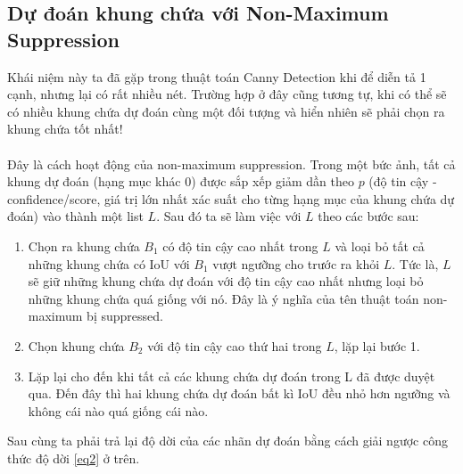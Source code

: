 \documentclass{article}
\begin{document}
\subsection{Dự đoán khung chứa với Non-Maximum Suppression}
Khái niệm này ta đã gặp trong thuật toán Canny Detection khi để diễn tả 1 cạnh, nhưng lại có rất nhiều nét. Trường hợp ở đây cũng tương tự, khi có thể sẽ có nhiều khung chứa dự đoán cùng một đối tượng và hiển nhiên sẽ phải chọn ra khung chứa tốt nhất!\\\\
Đây là cách hoạt động của non-maximum suppression. Trong một bức ảnh, tất cả khung dự đoán (hạng mục khác 0) được sắp xếp giảm dần theo $p$ (độ tin cậy - confidence/score, giá trị lớn nhất xác suất cho từng hạng mục của khung chứa dự đoán) vào thành một list $L$. Sau đó ta sẽ làm việc với $L$ theo các bước sau:
\begin{enumerate}
    \item Chọn ra khung chứa $B_1$ có độ tin cậy cao nhất trong $L$ và loại bỏ tất cả những khung chứa có IoU với $B_1$ vượt ngưỡng cho trước ra khỏi $L$. Tức là, $L$ sẽ giữ những khung chứa dự đoán với độ tin cậy cao nhất nhưng loại bỏ những khung chứa quá giống với nó. Đây là ý nghĩa của tên thuật toán non-maximum bị suppressed.
    \item Chọn khung chứa $B_2$ với độ tin cậy cao thứ hai trong $L$, lặp lại bước 1.
    \item Lặp lại cho đến khi tất cả các khung chứa dự đoán trong L đã được duyệt qua. Đến đây thì hai khung chứa dự đoán bất kì IoU đều nhỏ hơn ngưỡng và không cái nào quá giống cái nào.
\end{enumerate}
Sau cùng ta phải trả lại độ dời của các nhãn dự đoán bằng cách giải ngược công thức độ dời \ref{eq2} ở trên.
\end{document}
